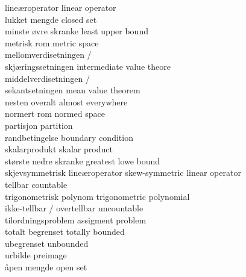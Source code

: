\documentclass[11pt]{amsart}
\begin{document}
\begin{tabbing}
\> lineæroperator \> linear operator \\
\> lukket mengde \> closed set \\
\>  minste øvre skranke \> least upper bound  \\
\> metrisk rom \> metric space  \\
\> mellomverdisetningen /\\
\> skjæringssetningen \> intermediate value theore  \\
\> middelverdisetningen / \\
\> sekantsetningen \> mean value theorem  \\
\> nesten overalt \> almost everywhere \\
\> normert rom \> normed space \\
\>  partisjon\> partition \\ 
\> randbetingelse \> boundary condition  \\
\> skalarprodukt \> skalar product  \\
\> største nedre skranke \> greatest lowe bound  \\
\> skjevsymmetrisk lineæroperator \> skew-symmetric linear operator \\
\> tellbar \> countable \\
\> trigonometrisk polynom \> trigonometric polynomial  \\
\> ikke-tellbar / overtellbar \> uncountable  \\
\> tilordningsproblem \> assigment problem \\
\> totalt begrenset  \> totally bounded \\
\> ubegrenset \> unbounded  \\
\> urbilde \> preimage \\
\> \aa pen mengde \> open set \\

\end{tabbing}
\end{document}
